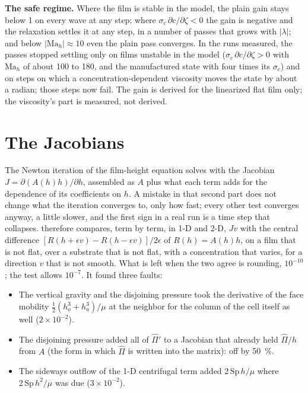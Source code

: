 \textbf{The safe regime.} Where the film is stable in the model, the plain
gain stays below 1 on every wave at any step; where $\sigma_c\,\partial
c/\partial\zeta < 0$ the gain is negative and the relaxation settles it at any
step, in a number of passes that grows with $|\lambda|$; and below
$|\mathrm{Ma}_h| \approx 10$ even the plain pass converges. In the runs
measured, the passes stopped settling only on films unstable in the model
($\sigma_c\,\partial c/\partial\zeta > 0$ with $\mathrm{Ma}_h$ of about
100 to 180, and the manufactured state with four times its $\sigma_c$)
and on steps on which a concentration-dependent viscosity moves the state by
about a radian; those steps now fail. The gain is derived for the
linearized flat film only; the viscosity's part is measured, not derived.

\section{The Jacobians}
\label{sec:verification:jacobian}

The Newton iteration of the film-height equation solves with the Jacobian
$J = \partial(A(h)h)/\partial h$, assembled as $A$ plus what each term adds for
the dependence of its coefficients on $h$. A mistake in that second part does
not change what the iteration converges to, only how fast; every other test
converges anyway, a little slower, and the first sign in a real run is a time
step that collapses.  therefore compares, term by
term, in 1-D and 2-D, $J v$ with the central difference $[R(h+\epsilon v) -
R(h-\epsilon v)]/2\epsilon$ of $R(h) = A(h)h$, on a film that is not flat, over
a substrate that is not flat, with a concentration that varies, for a
direction $v$ that is not smooth. What is left when the two agree is
rounding, $10^{-10}$; the test allows $10^{-7}$. It found three faults:

\begin{itemize}
  \item The vertical gravity and the disjoining pressure took the derivative
    of the face mobility $\tfrac12(h_o^3 + h_a^3)/\mu$ at the neighbor for the
    column of the cell itself as well ($2\times10^{-2}$).
  \item The disjoining pressure added all of $\hat\Pi'$ to a Jacobian that
    already held $\hat\Pi/h$ from $A$ (the form in which $\hat\Pi$ is written
    into the matrix): off by \SI{50}{\percent}.
  \item The sideways outflow of the 1-D centrifugal term added $2\,\mathrm{Sp}\,h/\mu$
    where $2\,\mathrm{Sp}\,h^2/\mu$ was due ($3\times10^{-2}$).
\end{itemize}

